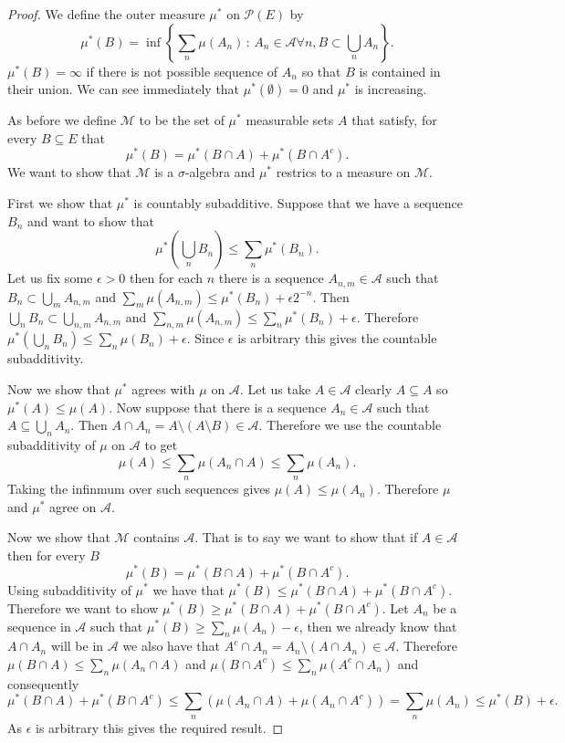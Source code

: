 \documentclass[11pt]{article}
\theoremstyle{definition}
\theoremstyle{remark}
\begin{document}
\begin{proof}
We define the outer measure $\mu^*$ on $\mathscr{P}(E)$ by
\[ \mu^*(B) = \inf \left\{ \sum_n \mu(A_n) \,:\, A_n \in \mathcal{A} \forall n, B \subset \bigcup_n A_n \right\}. \] $\mu^*(B) = \infty$ if there is not possible sequence of $A_n$ so that $B$ is contained in their union. We can see immediately that $\mu^*(\emptyset) =0$ and $\mu^*$ is increasing. 

As before we define $\mathscr{M}$ to be the set of $\mu^*$ measurable sets $A$ that satisfy, for every $B \subseteq E$ that
\[ \mu^*(B) = \mu^*(B \cap A) + \mu^*(B \cap A^c).  \] We want to show that $\mathscr{M}$ is a $\sigma$-algebra and $\mu^*$ restrics to a measure on $\mathscr{M}$.

First we show that $\mu^*$ is countably subadditive. Suppose that we have a sequence $B_n$ and want to show that
\[ \mu^*\left( \bigcup_n B_n\right) \leq \sum_n \mu^*(B_n). \] Let us fix some $\epsilon >0$ then for each $n$ there is a sequence $A_{n,m} \in \mathcal{A}$ such that $B_n \subset \bigcup_m A_{n,m}$ and $\sum_m \mu(A_{n,m}) \leq \mu^*(B_n) + \epsilon 2^{-n}$. Then $\bigcup_n B_n \subset \bigcup_{n,m} A_{n,m}$ and $\sum_{n,m}\mu(A_{n,m}) \leq \sum_n \mu^*(B_n) + \epsilon$. Therefore $\mu^* \left( \bigcup_n B_n \right) \leq \sum_n \mu(B_n) + \epsilon$. Since $\epsilon$ is arbitrary this gives the countable subadditivity. 

Now we show that $\mu^*$ agrees with $\mu$ on $\mathcal{A}$. Let us take $A \in \mathcal{A}$ clearly $A \subseteq A$ so $\mu^*(A) \leq \mu(A)$. Now suppose that there is a sequence $A_n \in \mathcal{A}$ such that $A \subseteq \bigcup_n A_n$. Then $A \cap A_n = A \setminus (A \setminus B) \in \mathcal{A}$. Therefore we use the countable subadditivity of $\mu$ on $\mathcal{A}$ to get
\[ \mu (A) \leq  \sum_n \mu(A_n \cap A) \leq \sum_n \mu(A_n).\] Taking the infinmum over such sequences gives $\mu(A) \leq \mu(A_n)$. Therefore $\mu$ and $\mu^*$ agree on $\mathcal{A}$. 

Now we show that $\mathscr{M}$ contains $\mathcal{A}$. That is to say we want to show that if $A \in \mathcal{A}$ then for every $B$
\[ \mu^*(B) = \mu^*(B \cap A) + \mu^*(B \cap A^c). \] Using subadditivity of $\mu^*$ we have that $\mu^*(B) \leq \mu^*(B \cap A) + \mu^*(B \cap A^c)$. Therefore we want to show $\mu^*(B) \geq \mu^*(B \cap A) + \mu^*(B \cap A^c)$. Let $A_n$ be a sequence in $\mathcal{A}$ such that $\mu^*(B) \geq \sum_n \mu(A_n) - \epsilon$, then we already know that $A \cap A_n$ will be in $\mathcal{A}$ we also have that $A^c \cap A_n = A_n \setminus (A \cap A_n) \in \mathcal{A}$. Therefore $\mu(B \cap A) \leq \sum_n \mu(A_n \cap A)$ and $\mu(B \cap A^c) \leq \sum_n \mu(A^c \cap A_n)$ and consequently
\[ \mu^*(B \cap A) + \mu^*(B \cap A^c) \leq \sum_n \left( \mu(A_n \cap A) + \mu(A_n \cap A^c) \right) = \sum_n \mu(A_n) \leq \mu^*(B) + \epsilon. \] As $\epsilon$ is arbitrary this gives the required result. 


\end{proof}
\end{document}
